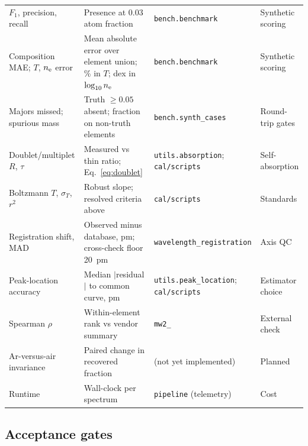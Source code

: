\begin{table}[t]
\begin{tabular}{@{}p{2.6cm}p{5.0cm}p{2.9cm}p{2.9cm}@{}}
$F_1$, precision, recall & Presence at 0.03 atom fraction & \texttt{bench.benchmark} & Synthetic scoring \\
Composition MAE; $T$, $n_{\mathrm{e}}$ error & Mean absolute error over element union; \% in $T$; dex in $\log_{10}n_{\mathrm{e}}$ & \texttt{bench.benchmark} & Synthetic scoring \\
Majors missed; spurious mass & Truth $\ge0.05$ absent; fraction on non-truth elements & \texttt{bench.synth\_\allowbreak cases} & Round-trip gates \\
Doublet/multiplet $R$, $\tau$ & Measured vs thin ratio; Eq.~\eqref{eq:doublet} & \texttt{utils.absorption}; \texttt{cal/\allowbreak scripts} & Self-absorption \\
Boltzmann $T$, $\sigma_T$, $r^2$ & Robust slope; resolved criteria above & \texttt{cal/\allowbreak scripts} & Standards \\
Registration shift, MAD & Observed minus database, pm; cross-check floor 20~pm & \texttt{wavelength\_\allowbreak registration} & Axis QC \\
Peak-location accuracy & Median $|$residual$|$ to common curve, pm & \texttt{utils.peak\_\allowbreak location}; \texttt{cal/\allowbreak scripts} & Estimator choice \\
Spearman $\rho$ & Within-element rank vs vendor summary & \texttt{mw2\_\allowbreak 112} & External check \\
Ar-versus-air invariance & Paired change in recovered fraction & (not yet implemented) & Planned \\
Runtime & Wall-clock per spectrum & \texttt{pipeline} (telemetry) & Cost \\
\bottomrule
\end{tabular}
\end{table}

\subsection{Acceptance gates}

